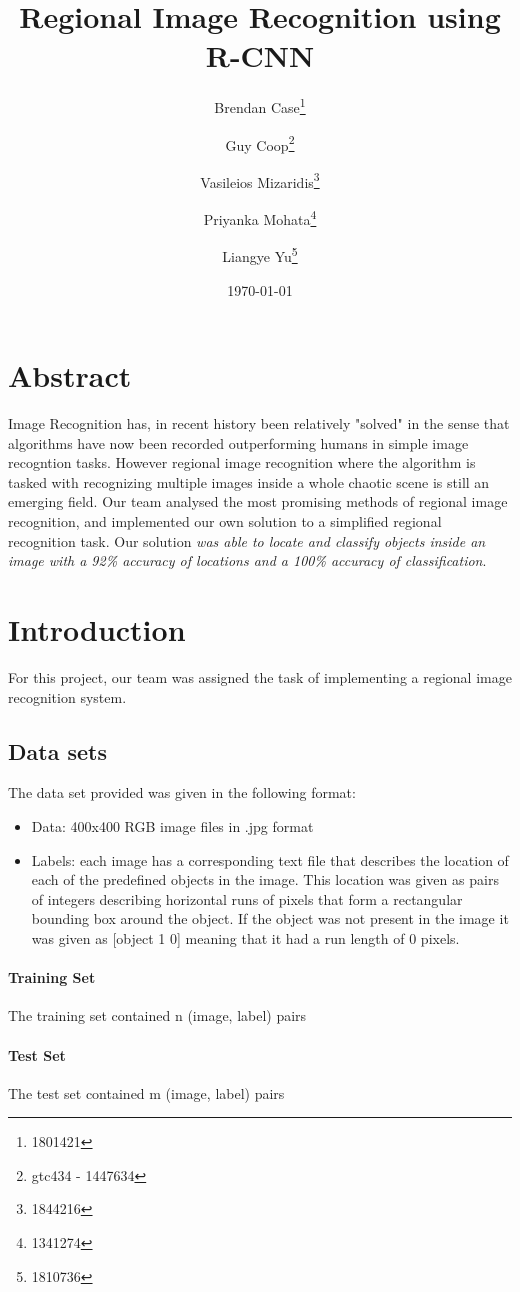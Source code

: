 \documentclass[10pt]{article}
\author{
	Brendan Case{\footnote{1801421}} 
	\and Guy Coop{\footnote{gtc434 - 1447634}}
	\and Vasileios Mizaridis{\footnote{1844216}}
	\and Priyanka Mohata{\footnote{1341274}}
	\and Liangye Yu{\footnote{1810736}}
	}
\title{Regional Image Recognition using R-CNN}
\date{\today}
\begin{document}
 \maketitle
 
\section*{Abstract}
Image Recognition has, in recent history been relatively "solved" in the sense that algorithms have now been recorded outperforming humans in simple image recogntion tasks. However regional image recognition where the algorithm is tasked with recognizing multiple images inside a whole chaotic scene is still an emerging field. Our team analysed the most promising methods of regional image recognition, and implemented our own solution to a simplified regional recognition task. Our solution {\it was able to locate and classify objects inside an image with a 92\% accuracy of locations and a 100\% accuracy of classification}.


\newpage
\tableofcontents
\newpage

\section{Introduction}
For this project, our team was assigned the task of implementing a regional image recognition system.
\subsection{Data sets}
The data set provided was given in the following format:
\begin{itemize}
	\item Data: 400x400 RGB image files in .jpg format
	\item Labels: each image has a corresponding text file that describes the location of each of the predefined objects in the image. This location was given as pairs of integers describing horizontal runs of pixels that form a rectangular bounding box around the object. If the object was not present in the image it was given as [object 1 0] meaning that it had a run length of 0 pixels.
\end{itemize}
\paragraph{Training Set}
The training set contained n (image, label) pairs 

\paragraph{Test Set}
The test set contained m (image, label) pairs
\end{document}
